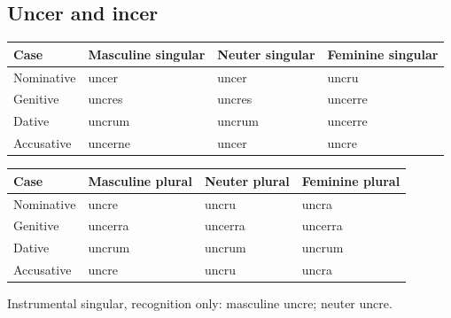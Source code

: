 \subsection*{Uncer and incer}

\par\begingroup
\fontsize{10.5}{13.2}\selectfont
\setlength{\LTleft}{0pt}\setlength{\LTright}{\fill}
\noindent
\begin{tabular}{@{}>{\raggedright\arraybackslash}p{22.0mm}>{\raggedright\arraybackslash}p{31.188mm}>{\raggedright\arraybackslash}p{31.188mm}>{\raggedright\arraybackslash}p{31.188mm}@{}}
\toprule
\textbf{Case} & \textbf{Masculine singular} & \textbf{Neuter singular} & \textbf{Feminine singular} \\
\midrule
Nominative & uncer & uncer & uncru \\
Genitive & uncres & uncres & uncerre \\
Dative & uncrum & uncrum & uncerre \\
Accusative & uncerne & uncer & uncre \\
\bottomrule
\end{tabular}
\par\endgroup
\par\addvspace{5pt}
\par\begingroup
\fontsize{10.5}{13.2}\selectfont
\setlength{\LTleft}{0pt}\setlength{\LTright}{\fill}
\noindent
\begin{tabular}{@{}>{\raggedright\arraybackslash}p{22.0mm}>{\raggedright\arraybackslash}p{31.188mm}>{\raggedright\arraybackslash}p{31.188mm}>{\raggedright\arraybackslash}p{31.188mm}@{}}
\toprule
\textbf{Case} & \textbf{Masculine plural} & \textbf{Neuter plural} & \textbf{Feminine plural} \\
\midrule
Nominative & uncre & uncru & uncra \\
Genitive & uncerra & uncerra & uncerra \\
Dative & uncrum & uncrum & uncrum \\
Accusative & uncre & uncru & uncra \\
\bottomrule
\end{tabular}
\par\endgroup
Instrumental singular, recognition only: masculine uncre; neuter uncre.

